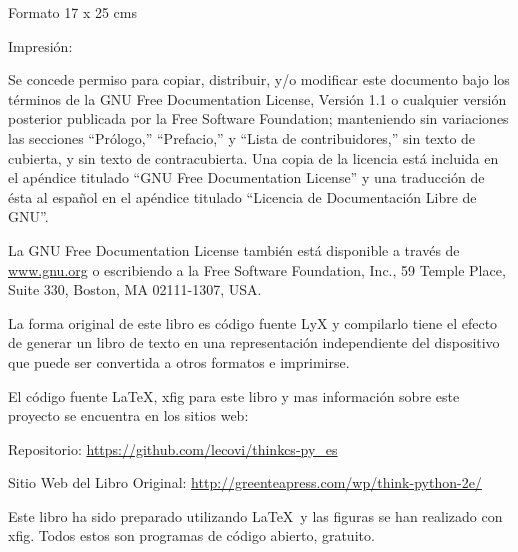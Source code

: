 {\scriptsize{}Formato 17 x 25 cms}\\
{\scriptsize{} %


{\scriptsize{} Impresión: \Fecha}


\newpage{}

\thispagestyle{empty} \vspace{0.25in}

Se concede permiso para copiar, distribuir, y/o modificar este documento
bajo los términos de la GNU Free Documentation License, Versión 1.1
o cualquier versión posterior publicada por la Free Software Foundation;
manteniendo sin variaciones las secciones ``Prólogo,'' ``Prefacio,''
y ``Lista de contribuidores,'' sin texto de cubierta, y sin texto
de contracubierta. Una copia de la licencia está incluida en el apéndice
titulado ``GNU Free Documentation License'' y una traducción de
ésta al español en el apéndice titulado ``Licencia de Documentación
Libre de GNU''.

La GNU Free Documentation License también está disponible a través
de \url{www.gnu.org} o escribiendo a la Free Software Foundation,
Inc., 59 Temple Place, Suite 330, Boston, MA 02111-1307, USA.

La forma original de este libro es código fuente LyX %
y compilarlo
tiene el efecto de generar un libro de texto en una representación
independiente del dispositivo que puede ser convertida a otros formatos
e imprimirse.

El código fuente \LaTeX{}, xfig para este libro y mas información
sobre este proyecto se encuentra en los sitios web:

Repositorio: \url{https://github.com/lecovi/thinkcs-py_es}

Sitio Web del Libro Original: \url{http://greenteapress.com/wp/think-python-2e/}

Este libro ha sido preparado utilizando \LaTeX{}\ y las figuras se han realizado con xfig.
Todos estos son programas de código abierto, gratuito.

}
